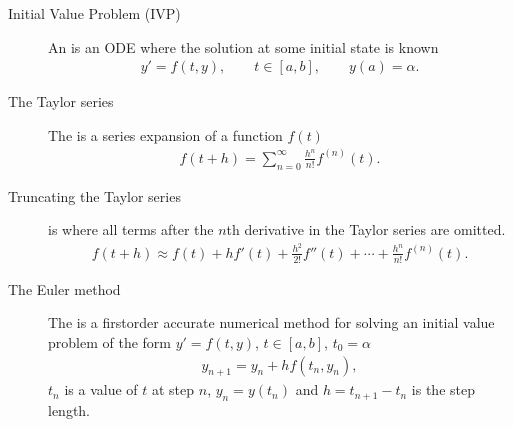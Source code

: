 \documentclass[letterpaper,10pt,english]{jupyterBook}
\begin{document}
\begin{description}
\item[{Initial Value Problem (IVP)    \label{\detokenize{8_Appendices/8.0_Cheat_sheet:term-Initial-Value-Problem-IVP}}}] \leavevmode
\sphinxAtStartPar
An {\hyperref[\detokenize{1_IVPs/1.0_IVPs:ivp-definition}]{}} is an ODE where the solution at some initial state is known
\begin{equation*}
\begin{split}y' = f(t, y), \qquad t \in [a, b], \qquad y(a) = \alpha.\end{split}
\end{equation*}
\item[{The Taylor series\label{\detokenize{8_Appendices/8.0_Cheat_sheet:term-The-Taylor-series}}}] \leavevmode
\sphinxAtStartPar
The {\hyperref[\detokenize{1_IVPs/1.1_Taylor_Series:taylor-series-section}]{}} is a series expansion of a function \(f(t)\)
\begin{equation*}
\begin{split}f(t + h) = \sum_{n=0}^\infty \frac{h^n}{n!}f^{(n)}(t).\end{split}
\end{equation*}
\item[{Truncating the Taylor series\label{\detokenize{8_Appendices/8.0_Cheat_sheet:term-Truncating-the-Taylor-series}}}] \leavevmode
\sphinxAtStartPar
{\hyperref[\detokenize{1_IVPs/1.1_Taylor_Series:taylor-series-section}]{}} is where all terms after the \(n\)th derivative in the Taylor series are omitted.
\begin{equation*}
\begin{split}f(t + h) \approx f(t) + hf'(t) + \frac{h^2}{2!} f''(t) + \cdots + \frac{h^n}{n!} f^{(n)}(t).\end{split}
\end{equation*}
\item[{The Euler method\label{\detokenize{8_Appendices/8.0_Cheat_sheet:term-The-Euler-method}}}] \leavevmode
\sphinxAtStartPar
The {\hyperref[\detokenize{1_IVPs/1.2_Euler_Method:euler-method-section}]{}} is a first\sphinxhyphen{}order accurate numerical method for solving an initial value problem of the form \(y' = f(t, y)\), \(t\in [a, b]\), \(t_0 = \alpha\)
\begin{equation*}
\begin{split}y_{n+1} = y_n + h f(t_n, y_n),\end{split}
\end{equation*}
\sphinxAtStartPar
\(t_n\) is a value of \(t\) at step \(n\), \(y_n = y(t_n)\) and \(h = t_{n+1} - t_n\) is the step length.


\end{description}
\end{document}
